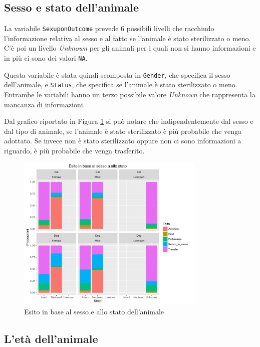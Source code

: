 \subsection{Sesso e stato dell'animale}

La variabile \texttt{SexuponOutcome} prevede 6 possibili livelli che racchiudo l'informazione relativa al sesso e al fatto se l'animale è stato sterilizzato o meno. C'è poi un livello \textit{Unknown} per gli animali per i quali non si hanno informazioni e in più ci sono dei valori \texttt{NA}.

Questa variabile è stata quindi scomposta in \texttt{Gender}, che specifica il sesso dell'animale, e \texttt{Status}, che specifica se l'animale è stato sterilizzato o meno. Entrambe le variabili hanno un terzo possibile valore \textit{Unknown} che rappresenta la mancanza di informazioni.

Dal grafico riportato in Figura \ref{fig-sesso-stato} si può notare che indipendentemente dal sesso e dal tipo di animale, se l'animale è stato sterilizzato è più probabile che venga adottato. Se invece non è stato sterilizzato oppure non ci sono informazioni a riguardo, è più probabile che venga trasferito.

\begin{figure}[htbp]
	\centering
	\includegraphics[width=0.8\textwidth]{./grafici/esito_sesso_stato.pdf}
	\caption{Esito in base al sesso e allo stato dell'animale}\label{fig-sesso-stato}
\end{figure}

\subsection{L'età dell'animale}

